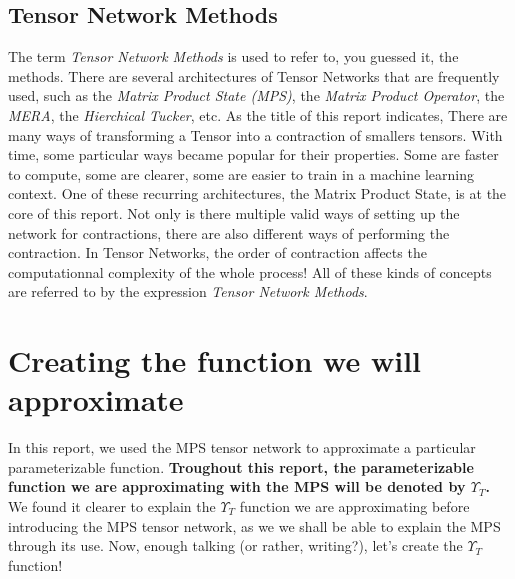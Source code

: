 \documentclass{article}
\theoremstyle{definition}
\theoremstyle{definition}
\begin{document}
\subsection{Tensor Network Methods}
The term {\it Tensor Network Methods} is used to refer to, you guessed it, the methods.
There are several architectures of Tensor Networks that are frequently used, such as the {\it Matrix Product State (MPS)}, the \emph{Matrix Product Operator}, the \emph{MERA}, the \emph{Hierchical Tucker}, etc. As the title of this report indicates, 
There are many ways of transforming a Tensor into a contraction of smallers tensors. 
With time, some particular ways became popular for their properties. 
Some are faster to compute, some are clearer, some are easier to train in a machine learning context. 
One of these recurring architectures, the Matrix Product State, is at the core of this report.
Not only is there multiple valid ways of setting up the network for contractions, there are also different ways of performing the contraction.
In Tensor Networks, the order of contraction affects the computationnal complexity of the whole process!
All of these kinds of concepts are referred to by the expression \emph{Tensor Network Methods}. 

\section{Creating the function we will approximate}
In this report, we used the MPS tensor network to approximate a particular parameterizable function.
{\bf Troughout this report, the parameterizable function we are approximating with the MPS will be denoted by $\Upsilon_{T}$. }
We found it clearer to explain the $\Upsilon_{T}$ function we are approximating before introducing the MPS tensor network, as we we shall be able to explain the MPS through its use.
Now, enough talking (or rather, writing?), let's create the $\Upsilon_{T}$ function!
\end{document}
